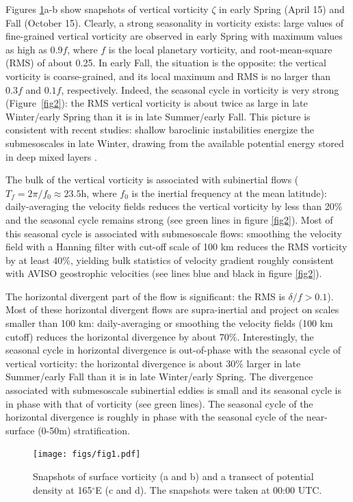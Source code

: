\documentclass[grl]{agutex2015}
\begin{document}
\begin{article}
Figures \ref{fig1}a-b show snapshots of vertical vorticity $\zeta$ in early Spring
(April 15) and Fall (October 15). Clearly, a strong seasonality in vorticity
exists: large values of fine-grained vertical vorticity are
observed in early Spring with maximum values as high as $0.9f$, where $f$ is
the local planetary vorticity, and root-mean-square (RMS) of about 0.25. In early
Fall, the situation is the opposite: the vertical vorticity is coarse-grained,
and its local maximum and RMS is no larger than $0.3f$ and $0.1f$, respectively.
Indeed, the seasonal cycle in vorticity is very strong (Figure~\ref{fig2}):
the RMS vertical vorticity is about twice as large in late Winter/early Spring
than it is in late Summer/early Fall. This picture is consistent with
recent studies: shallow baroclinic instabilities energize the submesoscales
in late Winter, drawing from the available potential energy stored in deep mixed
layers \citep{sasaki_etal2014,callies_etal2015,callies_etal2016}.

The bulk of the vertical vorticity is associated with subinertial flows
($T_f = 2\pi/f_0\approx 23.5$h, where $f_0$ is the inertial frequency at
the mean latitude): daily-averaging the velocity fields reduces the vertical
vorticity by less than 20$\%$ and the seasonal cycle remains strong (see
green lines in figure \ref{fig2}). Most of this seasonal cycle is associated
with submesoscale flows: smoothing the velocity field
with a Hanning filter with cut-off scale of 100 km reduces the RMS vorticity by
at least 40$\%$, yielding bulk statistics of velocity gradient roughly consistent
with AVISO geostrophic velocities (see lines blue and black in figure \ref{fig2}).

The horizontal divergent part of the flow is significant: the RMS is $\delta/f > 0.1$).
Most of these horizontal divergent flows are supra-inertial and project
on scales smaller than 100 km: daily-averaging or smoothing the velocity fields
 (100 km cutoff) reduces the horizontal divergence by about 70$\%$.
Interestingly, the seasonal cycle in horizontal divergence is out-of-phase with the
seasonal cycle of vertical vorticity: the horizontal divergence is about 30$\%$ larger in late
Summer/early Fall than it is in late Winter/early Spring. The divergence associated
with submesoscale subinertial eddies is small and its seasonal cycle is in phase
with that of vorticity (see green lines).  The seasonal cycle of the horizontal
divergence is roughly in phase with the seasonal cycle of the near-surface (0-50m)
stratification.
\begin{figure}[ht]
\begin{center}
\texttt{[image: figs/fig1.pdf]}
 \caption{Snapshots of surface vorticity (a and b) and a transect
          of potential density at 165$^\circ$E (c and d). The snapshots were
          taken at 00:00 UTC.}
\vspace{-1.5cm}
 \label{fig1}
 \end{center}
 \end{figure}


\end{article}
\end{document}
